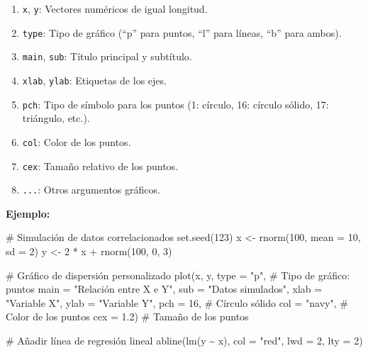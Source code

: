 \documentclass[
  spanish,
  a4paper,
  DIV=11,
  numbers=noendperiod,
  onepage,
  openany]{scrreprt}
\newenvironment{Shaded}{\begin{snugshade}}{\end{snugshade}}
\newcommand{\AttributeTok}[1]{\textcolor[rgb]{0.40,0.45,0.13}{#1}}
\newcommand{\CommentTok}[1]{\textcolor[rgb]{0.37,0.37,0.37}{#1}}
\newcommand{\DecValTok}[1]{\textcolor[rgb]{0.68,0.00,0.00}{#1}}
\newcommand{\FloatTok}[1]{\textcolor[rgb]{0.68,0.00,0.00}{#1}}
\newcommand{\FunctionTok}[1]{\textcolor[rgb]{0.28,0.35,0.67}{#1}}
\newcommand{\NormalTok}[1]{\textcolor[rgb]{0.00,0.23,0.31}{#1}}
\newcommand{\OtherTok}[1]{\textcolor[rgb]{0.00,0.23,0.31}{#1}}
\newcommand{\SpecialCharTok}[1]{\textcolor[rgb]{0.37,0.37,0.37}{#1}}
\newcommand{\StringTok}[1]{\textcolor[rgb]{0.13,0.47,0.30}{#1}}
\begin{document}
\begin{enumerate}
\def\labelenumi{\arabic{enumi}.}
\item
  \texttt{x}, \texttt{y}: Vectores numéricos de igual longitud.
\item
  \texttt{type}: Tipo de gráfico (``p'' para puntos, ``l'' para líneas,
  ``b'' para ambos).
\item
  \texttt{main}, \texttt{sub}: Título principal y subtítulo.
\item
  \texttt{xlab}, \texttt{ylab}: Etiquetas de los ejes.
\item
  \texttt{pch}: Tipo de símbolo para los puntos (1: círculo, 16: círculo
  sólido, 17: triángulo, etc.).
\item
  \texttt{col}: Color de los puntos.
\item
  \texttt{cex}: Tamaño relativo de los puntos.
\item
  \texttt{...}: Otros argumentos gráficos.
\end{enumerate}

\textbf{Ejemplo:}

\begin{Shaded}
\begin{Highlighting}[]
\CommentTok{\# Simulación de datos correlacionados}
\FunctionTok{set.seed}\NormalTok{(}\DecValTok{123}\NormalTok{)}
\NormalTok{x }\OtherTok{\textless{}{-}} \FunctionTok{rnorm}\NormalTok{(}\DecValTok{100}\NormalTok{, }\AttributeTok{mean =} \DecValTok{10}\NormalTok{, }\AttributeTok{sd =} \DecValTok{2}\NormalTok{)}
\NormalTok{y }\OtherTok{\textless{}{-}} \DecValTok{2} \SpecialCharTok{*}\NormalTok{ x }\SpecialCharTok{+} \FunctionTok{rnorm}\NormalTok{(}\DecValTok{100}\NormalTok{, }\DecValTok{0}\NormalTok{, }\DecValTok{3}\NormalTok{)}

\CommentTok{\# Gráfico de dispersión personalizado}
\FunctionTok{plot}\NormalTok{(x, y,}
     \AttributeTok{type =} \StringTok{"p"}\NormalTok{,                  }\CommentTok{\# Tipo de gráfico: puntos}
     \AttributeTok{main =} \StringTok{"Relación entre X e Y"}\NormalTok{,}
     \AttributeTok{sub =} \StringTok{"Datos simulados"}\NormalTok{,}
     \AttributeTok{xlab =} \StringTok{"Variable X"}\NormalTok{,}
     \AttributeTok{ylab =} \StringTok{"Variable Y"}\NormalTok{,}
     \AttributeTok{pch =} \DecValTok{16}\NormalTok{,                    }\CommentTok{\# Círculo sólido}
     \AttributeTok{col =} \StringTok{"navy"}\NormalTok{,                }\CommentTok{\# Color de los puntos}
     \AttributeTok{cex =} \FloatTok{1.2}\NormalTok{)                   }\CommentTok{\# Tamaño de los puntos}

\CommentTok{\# Añadir línea de regresión lineal}
\FunctionTok{abline}\NormalTok{(}\FunctionTok{lm}\NormalTok{(y }\SpecialCharTok{\textasciitilde{}}\NormalTok{ x), }\AttributeTok{col =} \StringTok{"red"}\NormalTok{, }\AttributeTok{lwd =} \DecValTok{2}\NormalTok{, }\AttributeTok{lty =} \DecValTok{2}\NormalTok{)}
\end{Highlighting}
\end{Shaded}
\end{document}

